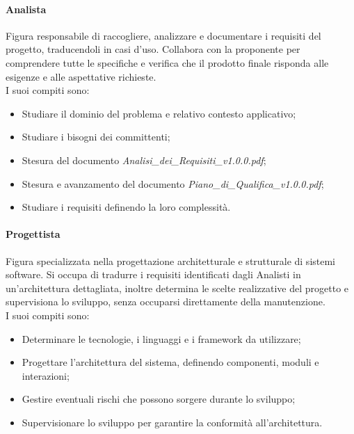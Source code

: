 \documentclass[10pt]{article}
\begin{document}
\begin{justify}
        \paragraph{Analista}
        Figura responsabile di raccogliere, analizzare e documentare i requisiti del progetto, traducendoli in casi d'uso. Collabora con la proponente per comprendere tutte le specifiche e verifica che il prodotto finale risponda alle esigenze e alle aspettative richieste.\\
        I suoi compiti sono:
        \begin{itemize}
            \item Studiare il dominio del problema e relativo contesto applicativo;
            \item Studiare i bisogni dei committenti;
            \item Stesura del documento \textit{Analisi\_dei\_Requisiti\_v1.0.0.pdf};
            \item Stesura e avanzamento del documento \textit{Piano\_di\_Qualifica\_v1.0.0.pdf};
            \item Studiare i requisiti definendo la loro complessità.
        \end{itemize}

        \paragraph{Progettista}
        Figura specializzata nella progettazione architetturale e strutturale di sistemi software. Si occupa di tradurre i requisiti identificati dagli Analisti in un'architettura dettagliata, inoltre determina le scelte realizzative del progetto e supervisiona lo sviluppo, senza occuparsi direttamente della manutenzione.\\
        I suoi compiti sono:
        \begin{itemize}
            \item Determinare le tecnologie, i linguaggi e i framework da utilizzare;
            \item Progettare l'architettura del sistema, definendo componenti, moduli e interazioni;
            \item Gestire eventuali rischi che possono sorgere durante lo sviluppo;
            \item Supervisionare lo sviluppo per garantire la conformità all'architettura.
        \end{itemize}


\end{justify}
\end{document}
